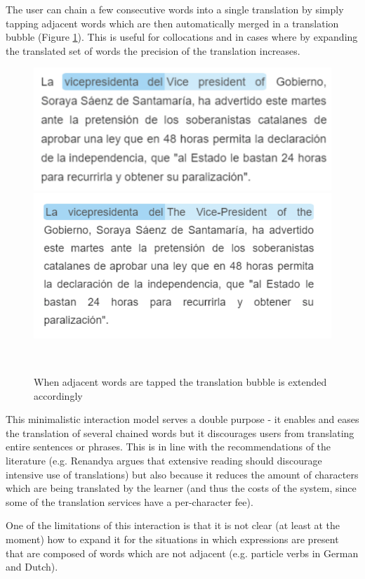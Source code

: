 The user can chain a few consecutive words into a single translation by simply tapping adjacent words which are then automatically merged in a translation bubble (Figure \ref{fig:translation_extension}). This is useful for collocations and in cases where by expanding the translated set of words the precision of the translation increases. 

    \begin{figure}[h!]
    \centering
      \includegraphics[width=0.8\columnwidth]{figures/translated_words1}
      \includegraphics[width=0.8\columnwidth]{figures/translated_words2}
      \caption{When adjacent words are tapped the translation bubble is extended accordingly}~\label{fig:translation_extension}
    \end{figure}

This minimalistic interaction model serves a double purpose - it enables and eases the translation of several chained words but it discourages users from translating entire sentences or phrases. This is in line with the recommendations of the literature (e.g. Renandya argues that extensive reading should discourage intensive use of translations\cite{renadya07-power}) but also because it reduces the amount of characters which are being translated by the learner (and thus the costs of the system, since some of the translation services have a per-character fee). 

One of the limitations of this interaction is that it is not clear (at least at the moment) how to expand it for the situations in which expressions are present that are composed of words which are not adjacent (e.g. particle verbs in German and Dutch).


